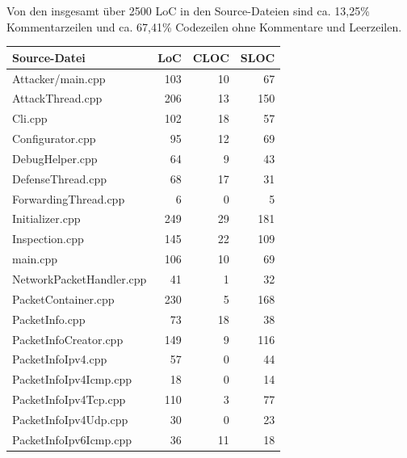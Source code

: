 \documentclass[../review_3.tex]{subfiles}
\begin{document}
Von den insgesamt über 2500 LoC in den Source-Dateien sind ca. 13,25\% Kommentarzeilen und ca. 67,41\% Codezeilen ohne Kommentare und Leerzeilen.
\begin{longtable}[H]{p{10cm}rrr} \toprule
    \textbf{Source-Datei}    & \textbf{LoC} & \textbf{CLOC} & \textbf{SLOC} \\ \midrule \endhead
    Attacker/main.cpp        & 103          & 10            & 67            \\
    AttackThread.cpp         & 206          & 13            & 150           \\
    Cli.cpp                  & 102          & 18            & 57            \\%
    Configurator.cpp         & 95           & 12            & 69            \\
    DebugHelper.cpp          & 64           & 9             & 43            \\
    DefenseThread.cpp        & 68           & 17            & 31            \\
    ForwardingThread.cpp     & 6            & 0             & 5             \\
    Initializer.cpp          & 249          & 29            & 181           \\
    Inspection.cpp           & 145          & 22            & 109           \\
    main.cpp                 & 106          & 10            & 69            \\
    NetworkPacketHandler.cpp & 41           & 1             & 32            \\
    PacketContainer.cpp      & 230          & 5             & 168           \\
    PacketInfo.cpp           & 73           & 18            & 38            \\
    PacketInfoCreator.cpp    & 149          & 9             & 116           \\
    PacketInfoIpv4.cpp       & 57           & 0             & 44            \\
    PacketInfoIpv4Icmp.cpp   & 18           & 0             & 14            \\
    PacketInfoIpv4Tcp.cpp    & 110          & 3             & 77            \\
    PacketInfoIpv4Udp.cpp    & 30           & 0             & 23            \\
    PacketInfoIpv6Icmp.cpp   & 36           & 11            & 18            \\

\end{longtable}
\end{document}
